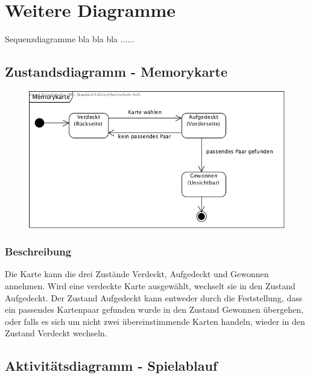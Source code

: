 \clearpage

\chapter{Weitere Diagramme}
Sequenzdiagramme bla bla bla ......


\section{Zustandsdiagramm - Memorykarte}

\begin{figure}[!h]
	\centering
    \includegraphics[width=\textwidth]{./ZD_Memorykarte.png}
	\label{layout_gesamt}
\end{figure}

\subsection{Beschreibung}
Die Karte kann die drei Zustände Verdeckt, Aufgedeckt und Gewonnen annehmen. Wird eine verdeckte Karte ausgewählt, wechselt sie in den Zustand Aufgedeckt. Der Zustand Aufgedeckt kann entweder durch die Feststellung, dass ein passendes Kartenpaar gefunden wurde in den Zustand Gewonnen übergehen, oder falls es sich um nicht zwei übereinstimmende Karten handeln, wieder in den Zustand Verdeckt wechseln.


\clearpage
\section{Aktivitätsdiagramm - Spielablauf}

